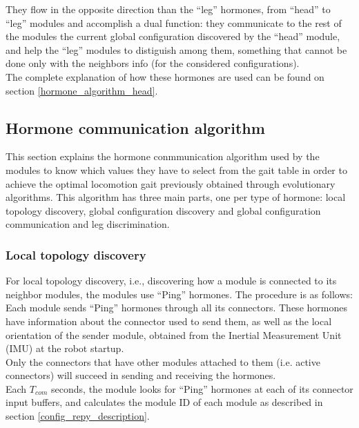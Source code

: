 They flow in the opposite direction than the ``leg'' hormones, from ``head'' to ``leg'' modules and accomplish a dual function: they communicate to the rest of the modules the current global configuration discovered by the ``head'' module, and help the ``leg'' modules to distiguish among them, something that cannot be done only with the neighbors info (for the considered configurations).\\

The complete explanation of how these hormones are used can be found on section \ref{hormone_algorithm_head}.\\

\subsection{Hormone communication algorithm}
\label{hormone_algorithm}

This section explains the hormone conmmunication algorithm used by the modules to know which values they have to select from the gait table in order to achieve the optimal locomotion gait previously obtained through evolutionary algorithms. This algorithm has three main parts, one per type of hormone: local topology discovery, global configuration discovery and global configuration communication and leg discrimination.\\

\subsubsection{Local topology discovery}
\label{hormone_algorithm_ping}
For local topology discovery, i.e., discovering how a module is connected to its neighbor modules, the modules use ``Ping'' hormones. The procedure is as follows:\\

Each module sends ``Ping'' hormones through all its connectors. These hormones have information about the connector used to send them, as well as the local orientation of the sender module, obtained from the Inertial Measurement Unit (IMU) at the robot startup.\\

Only the connectors that have other modules attached to them (i.e. active connectors) will succeed in sending and receiving the hormones.\\

Each $T_{com}$ seconds, the module looks for ``Ping'' hormones at each of its connector input buffers, and calculates the module ID of each module as described in section \ref{config_repy_description}.\\

